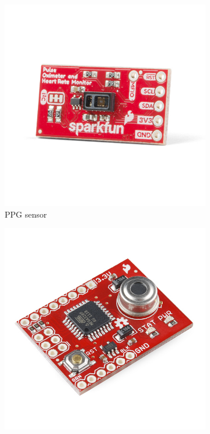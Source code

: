 \documentclass[10pt, conference]{IEEEtran}
\begin{document}
\begin{figure}[t]
    \centering
    \begin{subfigure}[b]{.3\linewidth}
        \centering
        \includegraphics[width=\linewidth]{resources/oximeter.jpg}
        \caption{PPG sensor}
        \label{fig:oximeter}
    \end{subfigure}%
    \begin{subfigure}[b]{.3\linewidth}
        \centering
        \includegraphics[width=\linewidth]{resources/thermoeter.jpg}

\end{subfigure}
\end{figure}
\end{document}
